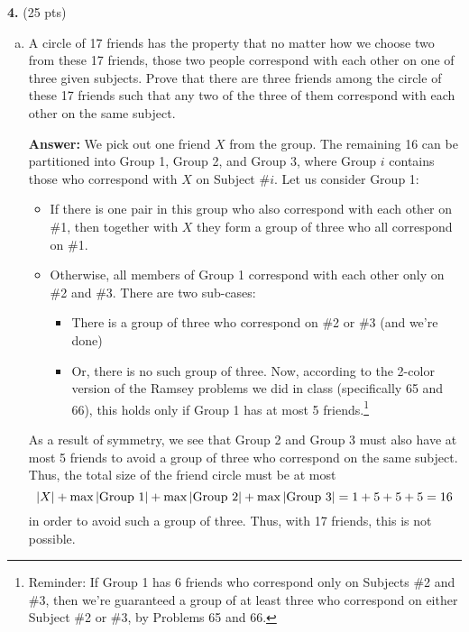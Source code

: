 \documentclass[11pt]{article}
\begin{document}
\newpage




\noindent \textbf{4.} (25 pts) 
\begin{enumerate}[(a)]
	\item A circle of 17 friends has the property that no matter how we choose two from
	these 17 friends, those two people correspond with each other on one of three given
	subjects. Prove that there are three friends among the circle of these 17 friends
	such that any two of the three of them correspond with each other on the same
	subject.

	
	\textbf{Answer:} We pick out one friend $X$ from the group. The remaining 16 can be partitioned into Group 1, Group 2, and Group 3, where Group $i$ contains those who correspond with $X$ on Subject \#$i$. Let us consider Group 1:
	\begin{itemize}
		\item If there is one pair in this group who also correspond with each other on \#1, then together with $X$ they form a group of three who all correspond on \#1.
		
		\item Otherwise, all members of Group 1 correspond with each other only on \#2 and \#3. There are two sub-cases:
		\begin{itemize}
			\item There is a group of three who correspond on \#2 or \#3 (and we're done)
 			\item Or, there is no such group of three. Now, according to the 2-color version of the Ramsey problems we did in class (specifically 65 and 66), this holds only if Group 1 has at most 5 friends.\footnote{Reminder: If Group 1 has 6 friends who correspond only on Subjects \#2 and \#3, then we're guaranteed a group of at least three who correspond on either Subject \#2 or \#3, by Problems 65 and 66.} 
		\end{itemize}
	\end{itemize}
	As a result of symmetry, we see that Group 2 and Group 3 must also have at most 5 friends to avoid a group of three who correspond on the same subject. Thus, the total size of the friend circle must be at most 
	\begin{equation*}
	\abs{X} + \max\abs{\text{Group 1} } + \max\abs{\text{Group 2} } + \max\abs{\text{Group 3} } = 1+5+5+5=16
	\end{equation*}
	in order to avoid such a group of three. Thus, with 17 friends, this is not possible.  
	

\end{enumerate}
\end{document}
